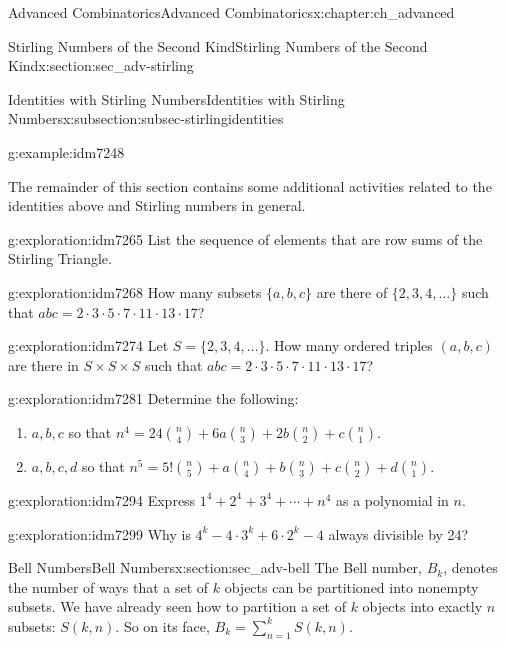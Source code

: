 \documentclass[oneside,10pt,]{book}
\numberwithin{equation}{chapter}
\begin{document}
\begin{chapterptx}{Advanced Combinatorics}{}{Advanced Combinatorics}{}{}{x:chapter:ch_advanced}
\begin{sectionptx}{Stirling Numbers of the Second Kind}{}{Stirling Numbers of the Second Kind}{}{}{x:section:sec_adv-stirling}
\begin{subsectionptx}{Identities with Stirling Numbers}{}{Identities with Stirling Numbers}{}{}{x:subsection:subsec-stirlingidentities}
\begin{example}{}{g:example:idm7248}
%
\end{example}
The remainder of this section contains some additional activities related to the identities above and Stirling numbers in general.%
\begin{exploration}{}{g:exploration:idm7265}%
List the sequence of elements that are row sums of the Stirling Triangle.%
\end{exploration}
\begin{exploration}{}{g:exploration:idm7268}%
How many subsets \(\{a,b,c\}\) are there of \(\{2,3,4,\ldots\}\) such that \(abc = 2 \cdot 3 \cdot 5 \cdot 7 \cdot 11 \cdot 13 \cdot 17\)?%
\end{exploration}
\begin{exploration}{}{g:exploration:idm7274}%
Let \(S = \{2,3,4,\ldots\}\).  How many ordered triples \((a,b,c)\) are there in \(S\times S \times S\) such that \(abc = 2 \cdot 3 \cdot 5 \cdot 7 \cdot 11 \cdot 13 \cdot 17\)?%
\end{exploration}
\begin{exploration}{}{g:exploration:idm7281}%
Determine the following:%
\begin{enumerate}[font=\bfseries,label=(\alph*),ref=\alph*]
\item{}\(a, b, c\) so that \(n^4 = 24\binom{n}{4} + 6a\binom{n}{3}+2b\binom{n}{2} + c \binom{n}{1}\).%
\item{}\(a, b, c, d\) so that \(n^5 = 5!\binom{n}{5} + a\binom{n}{4} + b\binom{n}{3} + c \binom{n}{2} + d \binom{n}{1}\).%
\end{enumerate}
\end{exploration}
\begin{exploration}{}{g:exploration:idm7294}%
Express \(1^4 + 2^4 + 3^4 + \cdots + n^4\) as a polynomial in \(n\).%
\end{exploration}
\begin{exploration}{}{g:exploration:idm7299}%
Why is \(4^k - 4\cdot 3^k + 6\cdot 2^k - 4\) always divisible by 24?%
\end{exploration}
\end{subsectionptx}
\end{sectionptx}
%
%
\typeout{************************************************}
\typeout{************************************************}
%
\begin{sectionptx}{Bell Numbers}{}{Bell Numbers}{}{}{x:section:sec_adv-bell}
The Bell number, \(B_{k}\), denotes the number of ways that a set of \(k\) objects can be partitioned into nonempty subsets. We have already seen how to partition a set of \(k\) objects into exactly \(n\) subsets: \(S(k,n)\).  So on its face, \(B_k = \sum_{n=1}^kS(k,n)\).%

\end{sectionptx}
\end{chapterptx}
\end{document}
